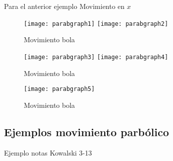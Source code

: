 Para el anterior ejemplo {Movimiento en $x$}
\begin{frame}
\begin{figure}
  \centering
  \texttt{[image: parabgraph1]} \texttt{[image: parabgraph2]}
  \caption{Movimiento bola}
  \label{fig:parabgraph1}
\end{figure}
\end{frame}

\begin{frame}
\begin{figure}
  \centering
  \texttt{[image: parabgraph3]}  \texttt{[image: parabgraph4]}
  \caption{Movimiento bola}
  \label{fig:parabgraph3}
\end{figure}
\end{frame}

\begin{frame}
\begin{figure}
  \centering
  \texttt{[image: parabgraph5]}
  \caption{Movimiento bola}
  \label{fig:parabgraph3}
\end{figure}
\end{frame}

\subsection{Ejemplos movimiento parbólico}

\begin{inprogress}
  Ejemplo notas Kowalski 3-13
\end{inprogress}

